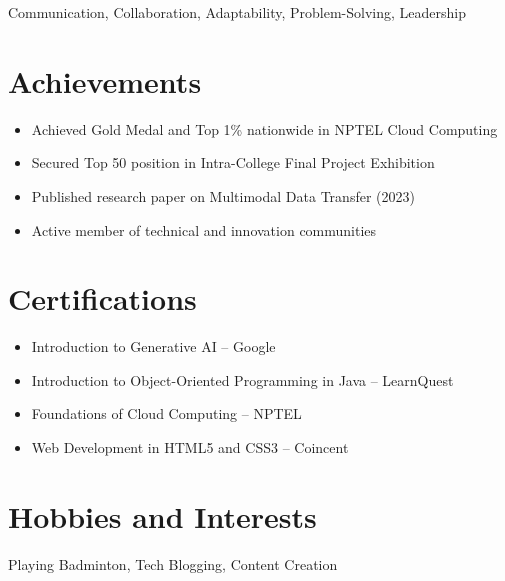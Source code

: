 \documentclass[a4paper,10pt]{article}
\begin{document}
Communication, Collaboration, Adaptability, Problem-Solving, Leadership

\section*{Achievements}

\begin{itemize}[leftmargin=*]
\item Achieved Gold Medal and Top 1\% nationwide in NPTEL Cloud Computing
\item Secured Top 50 position in Intra-College Final Project Exhibition
\item Published research paper on Multimodal Data Transfer (2023)
\item Active member of technical and innovation communities
\end{itemize}

\section*{Certifications}

\begin{itemize}[leftmargin=*]
\item Introduction to Generative AI – Google
\item Introduction to Object-Oriented Programming in Java – LearnQuest
\item Foundations of Cloud Computing – NPTEL
\item Web Development in HTML5 and CSS3 – Coincent
\end{itemize}

\section*{Hobbies and Interests}

Playing Badminton, Tech Blogging, Content Creation
\end{document}
